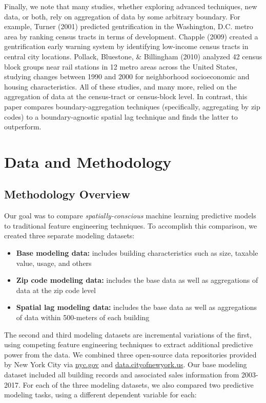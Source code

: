 \documentclass[12pt,]{article}
\providecommand{\tightlist}{%
  \setlength{\itemsep}{0pt}\setlength{\parskip}{0pt}}
\begin{document}
Finally, we note that many studies, whether exploring advanced
techniques, new data, or both, rely on aggregation of data by some
arbitrary boundary. For example, Turner (2001) predicted gentrification
in the Washington, D.C. metro area by ranking census tracts in terms of
development. Chapple (2009) created a gentrification early warning
system by identifying low-income census tracts in central city
locations. Pollack, Bluestone, \& Billingham (2010) analyzed 42 census
block groups near rail stations in 12 metro areas across the United
States, studying changes between 1990 and 2000 for neighborhood
socioeconomic and housing characteristics. All of these studies, and
many more, relied on the aggregation of data at the census-tract or
census-block level. In contrast, this paper compares
boundary-aggregation techniques (specifically, aggregating by zip codes)
to a boundary-agnostic spatial lag technique and finds the latter to
outperform.

\hypertarget{data-and-methodology}{%
\section{Data and Methodology}\label{data-and-methodology}}

\hypertarget{methodology-overview}{%
\subsection{Methodology Overview}\label{methodology-overview}}

Our goal was to compare \emph{spatially-conscious} machine learning
predictive models to traditional feature engineering techniques. To
accomplish this comparison, we created three separate modeling datasets:

\begin{itemize}
\tightlist
\item
  \textbf{Base modeling data:} includes building characteristics such as
  size, taxable value, usage, and others
\item
  \textbf{Zip code modeling data:} includes the base data as well as
  aggregations of data at the zip code level
\item
  \textbf{Spatial lag modeling data:} includes the base data as well as
  aggregations of data within 500-meters of each building
\end{itemize}

\noindent The second and third modeling datasets are incremental
variations of the first, using competing feature engineering techniques
to extract additional predictive power from the data. We combined three
open-source data repositories provided by New York City via
\url{nyc.gov} and \url{data.cityofnewyork.us}. Our base modeling dataset
included all building records and associated sales information from
2003-2017. For each of the three modeling datasets, we also compared two
predictive modeling tasks, using a different dependent variable for
each:
\end{document}
